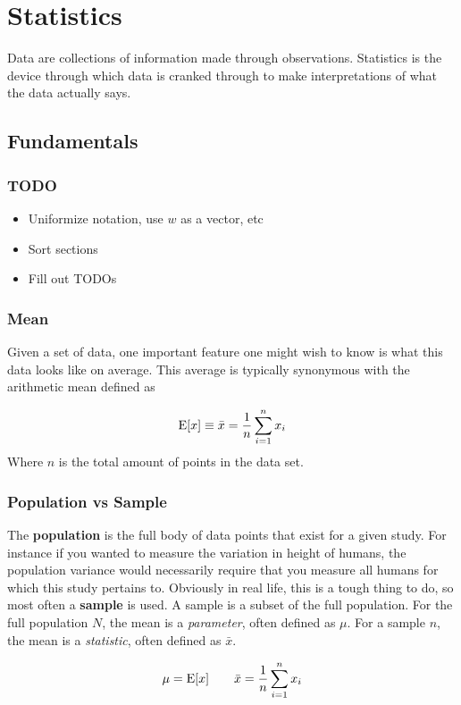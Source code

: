 \chapter{Statistics}
Data are collections of information made through observations. Statistics is the device through which data is cranked through to make interpretations of what the data actually says.

\section{Fundamentals}
\subsection{TODO}
\begin{itemize}
	\item Uniformize notation, use $w$ as a vector, etc
	\item Sort sections
	\item Fill out TODOs
\end{itemize}

\subsection{Mean}
Given a set of data, one important feature one might wish to know is what this data looks like on average. This average is typically synonymous with the arithmetic mean defined as 

\begin{align}
\mathrm{E}[x] \equiv \bar{x} = \frac{1}{n}\sum_{i=1}^n x_i
\end{align}
Where $n$ is the total amount of points in the data set.
\subsection{Population vs Sample}
The \textbf{population} is the full body of data points that exist for a given study. For instance if you wanted to measure the variation in height of humans, 
the population variance would necessarily require that you measure all humans for which this study pertains to. Obviously in real life, this is a tough thing to do, 
so most often a \textbf{sample} is used. A sample is a subset of the full population. For the full population $N$, the mean is a \emph{parameter}, often defined as $\mu$.
For a sample $n$, the mean is a \emph{statistic}, often defined as $\bar{x}$.

\begin{align}
\mu = \mathrm{E}[x] \qquad \bar{x} = \frac{1}{n}\sum_{i=1}^n x_i
\end{align}





